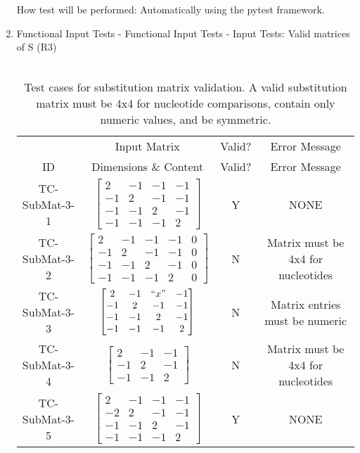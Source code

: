 \documentclass[12pt, titlepage]{article}
\begin{document}
\begin{enumerate}
How test will be performed: Automatically using the pytest framework.

\newpage

\item{Functional Input Tests - Functional Input Tests - Input Tests: Valid matrices of S (R3)\\\\}

\begin{table}[h]
  \centering
  \begin{tabular}{|c|c|c c|}
  \hline 
    & Input Matrix & Valid? & Error Message \\
  \cline{2-4}
  ID & Dimensions \& Content & Valid? & Error Message \\
  \hline
  TC-SubMat-3-1 & 
  $\begin{bmatrix} 
      2 & -1 & -1 & -1 \\ 
     -1 &  2 & -1 & -1 \\ 
     -1 & -1 &  2 & -1 \\ 
     -1 & -1 & -1 &  2 
  \end{bmatrix}$ & Y & NONE \\
  \hline
  TC-SubMat-3-2 & 
  $\begin{bmatrix} 
      2 & -1 & -1 & -1 & 0 \\ 
     -1 &  2 & -1 & -1 & 0 \\ 
     -1 & -1 &  2 & -1 & 0 \\ 
     -1 & -1 & -1 &  2 & 0 
  \end{bmatrix}$ & N & Matrix must be 4x4 for nucleotides \\
  \hline
  TC-SubMat-3-3 & 
  $\begin{bmatrix} 
      2 & -1 & ``x" & -1 \\ 
     -1 &  2 & -1 & -1 \\ 
     -1 & -1 &  2 & -1 \\ 
     -1 & -1 & -1 &  2 
  \end{bmatrix}$ & N & Matrix entries must be numeric \\
  \hline
  TC-SubMat-3-4 & 
  $\begin{bmatrix} 
      2 & -1 & -1 \\ 
     -1 &  2 & -1 \\ 
     -1 & -1 &  2  
  \end{bmatrix}$ & N & Matrix must be 4x4 for nucleotides \\
  \hline
  TC-SubMat-3-5 & 
  $\begin{bmatrix} 
      2 & -1 & -1 & -1 \\ 
     -2 &  2 & -1 & -1 \\ 
     -1 & -1 &  2 & -1 \\ 
     -1 & -1 & -1 &  2 
  \end{bmatrix}$ & Y & NONE \\
  \hline
  \end{tabular}
  \caption{Test cases for substitution matrix validation. A valid substitution matrix must be 4x4 for nucleotide comparisons, 
  contain only numeric values, and be symmetric.}
  \label{tab:test-case-3}
\end{table}



\end{enumerate}
\end{document}
